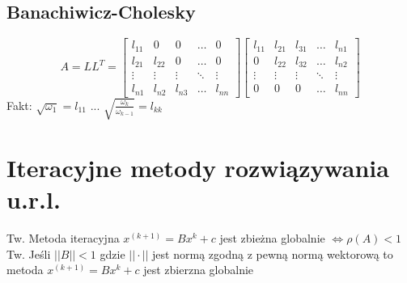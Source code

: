 \documentclass[10pt,twocolumn]{article}
\begin{document}
\begin{flushleft}
\subsection{Banachiwicz-Cholesky}
$$A = LL^T =
\begin{bmatrix}
    l_{11} & 0 & 0 & \dots  & 0 \\
    l_{21} & l_{22} & 0 & \dots  & 0 \\
    \vdots & \vdots & \vdots & \ddots & \vdots \\
    l_{n1} & l_{n2} & l_{n3} & \dots  & l_{nn}
\end{bmatrix}
\begin{bmatrix}
    l_{11} & l_{21} & l_{31} & \dots  & l_{n1} \\
    0 & l_{22} & l_{32} & \dots & l_{n2} \\
    \vdots & \vdots & \vdots & \ddots & \vdots \\
    0 & 0 & 0 & \dots  & l_{nn} 
\end{bmatrix}
$$
Fakt: $\sqrt{\omega_1} = l_{11}$ ... $\sqrt{\frac{\omega_{k}}{\omega_{k-1}}} = l_{kk}$ 

\section{Iteracyjne metody rozwiązywania u.r.l.}
Tw. Metoda iteracyjna $x^{(k+1)}=Bx^k+c$ jest zbieżna globalnie $\Leftrightarrow \rho(A) < 1$\\
Tw. Jeśli $||B|| < 1$ gdzie $||\cdot||$ jest normą zgodną z pewną normą wektorową to metoda $x^{(k+1)}=Bx^k+c$ jest zbierzna globalnie\\



\end{flushleft}
\end{document}
